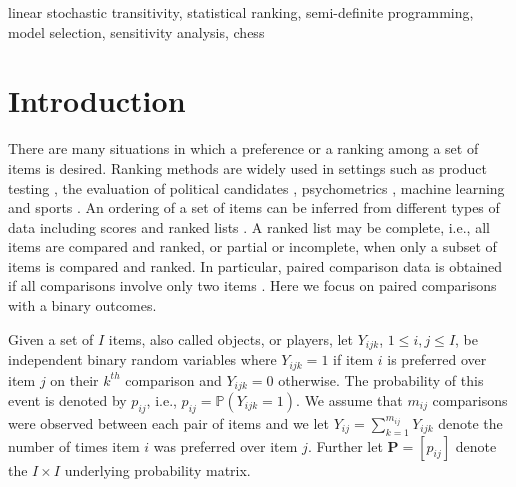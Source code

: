 \documentclass[twoside,11pt]{article}
\begin{document}
\begin{keywords}
linear stochastic transitivity, statistical ranking,  semi-definite programming, model selection, sensitivity analysis, chess
\end{keywords}

\section{Introduction}
\label{sec:introduction}


There are many situations in which a preference or a ranking among a set of items is desired. Ranking methods are widely used in settings such as product testing \citep{cremonesi}, the evaluation of political candidates  \citep{saari,pacuit}, psychometrics \citep{regenwetter3}, machine learning \citep{ailon3,shah2} and sports \citep{herbrich, govan1}. An ordering of a set of items can be inferred from different types of data including scores \citep{balinski} and ranked lists \citep{marden}. A ranked list may be complete, i.e., all items are compared and ranked, or partial or incomplete, when only a subset of items is compared and ranked. In particular, paired comparison data is obtained if all comparisons involve only two items \citep{david}. Here we focus on paired comparisons with a binary outcomes.

Given a set of $I$ items, also called objects, or players, let $Y_{ijk}$, $1\leq i,j \leq I$, be independent binary random variables where $Y_{ijk} = 1$ if item $i$ is preferred over item $j$ on their $k^{th}$ comparison and $Y_{ijk} = 0$ otherwise. The probability of this event is denoted by $p_{ij}$, i.e., $p_{ij}=\mathbb{P}(Y_{ijk} = 1)$. We assume that $m_{ij}$ comparisons were observed between each pair of items and we let $Y_{ij} = \sum_{k = 1}^{m_{ij}}Y_{ijk}$ denote the number of times item $i$ was preferred over item $j$. Further let $\boldsymbol{P} = [p_{ij}]$ denote the $I \times I$ underlying probability matrix. 
\end{document}
